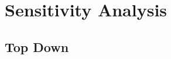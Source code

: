 \section{Sensitivity Analysis}\label{sec:sensitivity_analysis}
\subsection{Top Down}\label{subsec:sensitivity_analysis_top_down}
